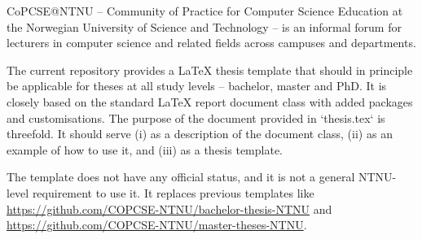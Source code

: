 \documentclass[../thesis.tex]{subfiles}
\begin{document}
CoPCSE@NTNU – Community of Practice for Computer Science Education at the Norwegian University of Science and Technology – is an informal forum for lecturers in computer science and related fields across campuses and departments.

The current repository provides a LaTeX thesis template that should in principle be applicable for theses at all study levels – bachelor, master and PhD. It is closely based on the standard LaTeX report document class with added packages and customisations. The purpose of the document provided in `thesis.tex` is threefold. It should serve (i) as a description of the document class, (ii) as an example of how to use it, and (iii) as a thesis template.

The template does not have any official status, and it is not a general NTNU-level requirement to use it. It replaces previous templates like \url{https://github.com/COPCSE-NTNU/bachelor-thesis-NTNU} and \url{https://github.com/COPCSE-NTNU/master-theses-NTNU}.
\end{document}
